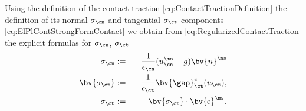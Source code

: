 Using the definition of the contact traction \ref{eq:ContactTractionDefinition} the definition of its normal $\sigma_{\cn}$ and tangential $\sigma_{\ct}$ components \ref{eq:ElPlContStrongFormContact} we obtain from \ref{eq:RegularizedContactTraction} the explicit formulas for $\sigma_{\cn}$, $\sigma_{\ct}$
\begin{eqnarray}
\sigma_{\cn}&:=&-\frac{1}{\epsilon_{\cn}}(u_{\cn}^{\ms\sl}-g)\bv{n}^{\ms}\label{eq:RegularizedContactTractionNormalComponent} \\
\bv{\sigma_{\ct}}&:=&-\frac{1}{\epsilon_{\ct}}\bv{\gap}^e_{\ct}(u_{\ct}),\label{eq:RegularizedContactTractionTangentComponentVector}\\
\sigma_{\ct}&:=&\bv{\sigma_{\ct}}\cdot \bv{{\mathrm e}}^{\ms}.\label{eq:RegularizedContactTractionTangentComponentScalar}
\end{eqnarray}


